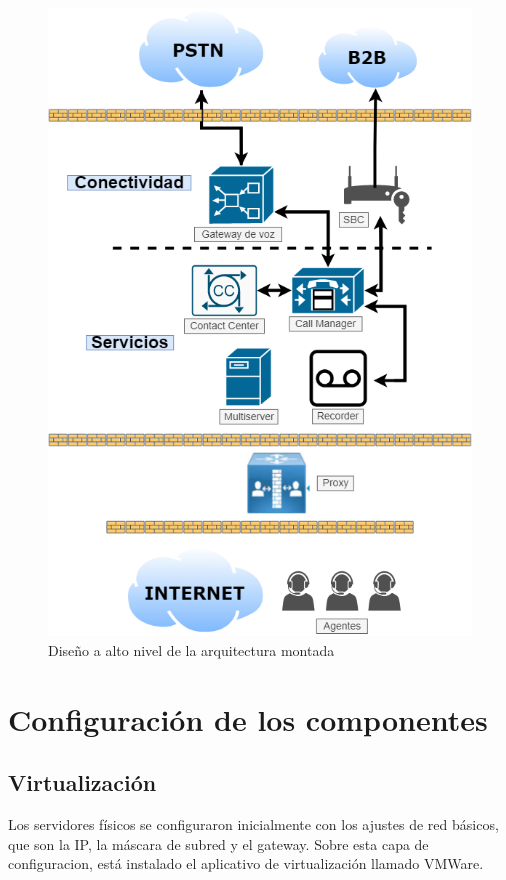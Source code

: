 \documentclass[a4paper, 12pt]{book}
\begin{document}
\begin{figure}[!]
  \centering
  \includegraphics[scale=0.55]{img/fig_arquitectura}
  \caption{Diseño a alto nivel de la arquitectura montada}
  \label{figura:fig_arquitectura}
\end{figure}

\section{Configuración de los componentes}
\label{sec:config}

\subsection{Virtualización}
\label{sec:vmware}
Los servidores físicos se configuraron inicialmente con los ajustes de red básicos, que son la IP, la máscara de subred y el gateway. Sobre esta capa de configuracion, está instalado el aplicativo de virtualización llamado VMWare. 
\end{document}
